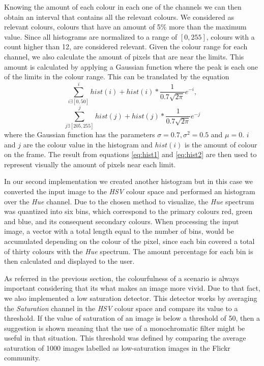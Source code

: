 Knowing the amount of each colour in each one of the channels we can then obtain an interval that contains all the relevant colours. We considered as relevant colours, colours that have an amount of 5\% more than the maximum value. Since all histograms are normalized to a range of $[0,255]$, colours with a count higher than 12, are considered relevant. Given the colour range for each channel, we also calculate the amount of pixels that are near the limits. This amount is calculated by applying a Gaussian function where the peak is each one of the limits in the colour range. This can be translated by the equation
\begin{equation}
	\sum_{i \exists [0,50]}^{i}hist(i) + hist(i)*\frac{1}{0.7\sqrt{2\pi}}e^{-i},
	\label{eq:hist1}
\end{equation}
\begin{equation}
	\sum_{j \exists [205,255]}^{j}hist(j) + hist(j)*\frac{1}{0.7\sqrt{2\pi}}e^{-j}
	\label{eq:hist2}
\end{equation}
where the Gaussian function has the parameters $\sigma = 0.7, \sigma^{2} = 0.5$ and $\mu = 0$. $i$ and $j$ are the colour value in the histogram and $hist(i)$ is the amount of colour on the frame. The result from equations \ref{eq:hist1} and \ref{eq:hist2} are then used to represent visually the amount of pixels near each limit. 

In our second implementation we created another histogram but in this case we converted the input image to the \emph{HSV} colour space and performed an histogram over the \emph{Hue} channel. Due to the chosen method to visualize, the \emph{Hue} spectrum was quantized into six bins, which correspond to the primary colours red, green and blue, and its consequent secondary colours.
When processing the input image, a vector with a total length equal to the number of bins, would be accumulated depending on the colour of the pixel, since each bin covered a total of thirty colours with the \emph{Hue} spectrum. The amount percentage for each bin is then calculated and displayed to the user.

As referred in the previous section, the colourfulness of a scenario is always important considering that its what makes an image more vivid. Due to that fact, we also implemented a low saturation detector. This detector works by averaging the \emph{Saturation} channel in the \emph{HSV} colour space and compare its value to a threshold. If the value of saturation of an image is below a threshold of 50, then a suggestion is shown meaning that the use of a monochromatic filter might be useful in that situation. This threshold was defined by comparing the average saturation of 1000 images labelled as low-saturation images in the Flickr community.

